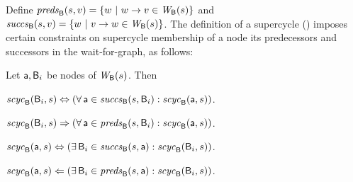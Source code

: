 Define
$\preds{\B}{s}{v} = \set{w \stt w \ar v \in \wfg{\B}{s}}$ and 
$\succs{\B}{s}{v} = \set{w \stt v \ar w \in \wfg{\B}{s}}$.
The definition of a supercycle () 
imposes certain constraints on supercycle membership of a node \wrt its predecessors and successors
in the wait-for-graph, as follows:

\begin{proposition}
\label{prop:sc-membership}
Let $\act, \B_i$ be nodes of $\wfg{\B}{s}$. Then
\bn

\item \label{clause:sc-membership:comp-out}
$\scyc{\B}{s}{\B_i} \ifof (\fa \act \in \succs{\B}{s}{\B_i} : \scyc{\B}{s}{\act})$.

\item \label{clause:sc-membership:comp-in}
$\scyc{\B}{s}{\B_i} \imp (\fa \act \in \preds{\B}{s}{\B_i} : \scyc{\B}{s}{\act})$.

\item \label{clause:sc-membership:act-out}
$\scyc{\B}{s}{\act} \ifof (\ex \B_i \in \succs{\B}{s}{\act} : \scyc{\B}{s}{\B_i})$.

\item \label{clause:sc-membership:act-in}
$\scyc{\B}{s}{\act} \folf (\ex \B_i \in \preds{\B}{s}{\act} : \scyc{\B}{s}{\B_i})$.

\en
\end{proposition}
%
